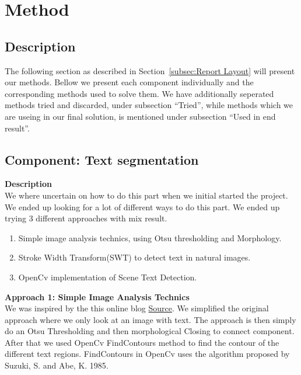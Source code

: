 \documentclass[11pt,a4paper,UKenglish]{article}
\begin{document}
\newpage
\section{Method}
\label{sec:Method}
\subsection{Description}
The following section as described in Section~\ref{subsec:Report Layout} will
present our methods. Bellow we present each component individually and the
corresponding methods used to solve them. We have additionally seperated
methods tried and discarded, under subsection ``Tried'', while methods which
we are useing in our final solution, is mentioned under subsection ``Used in
end result''.

\subsection{Component: Text segmentation}
\label{Method:Text_segmentation}
\textbf{Description} \\
We where uncertain on how to do this part when we initial started the project. We ended up looking for a lot of different ways to do this part. We ended up trying 3 different approaches with mix result.
\begin{enumerate}
  \item Simple image analysis technics, using Otsu thresholding and Morphology.
  \item Stroke Width Transform(SWT) to detect text in natural images.
  \item OpenCv implementation of Scene Text Detection.
\end{enumerate}

\begin{flushleft}
  \textbf{Approach 1: Simple Image Analysis Technics} \\
  We was inspired by the this online blog \href{https://www.danvk.org/2015/01/07/finding-blocks-of-text-in-an-image-using-python-opencv-and-numpy.html}{Source}\cite{_finding_????}. We simplified the original approach where we only look at an image with text. The approach is then simply do an Otsu Thresholding and then morphological Closing to connect component. After that we used OpenCv FindContours method to find the contour of the different text regions. FindContours in OpenCv uses the algorithm proposed by Suzuki, S. and Abe, K. 1985\cite{suzuki_topological_????}.
\end{flushleft}
\end{document}
